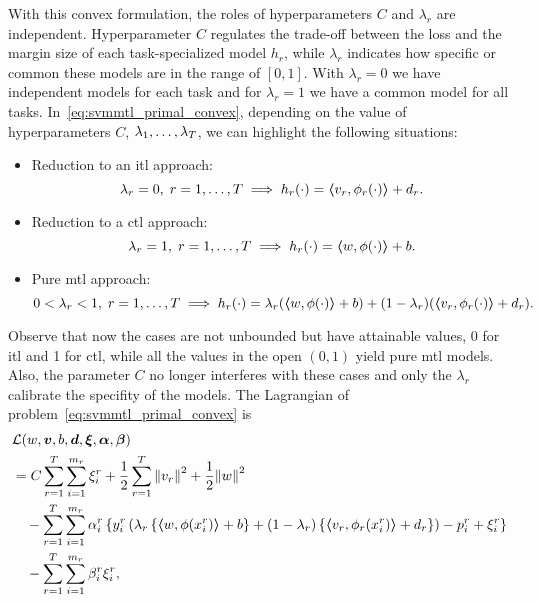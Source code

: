 With this convex formulation, the roles of hyperparameters $C$ and $\lambda_r$ are independent. Hyperparameter $C$ regulates the trade-off between the loss and the margin size of each task-specialized model $h_r$, while $\lambda_r$ indicates how specific or common these models are in the range of $[0, 1]$. With $\lambda_r=0$ we have independent models for each task and for $\lambda_r=1$ we have a common model for all tasks. 
%
In~\eqref{eq:svmmtl_primal_convex}, depending on the value of hyperparameters $C$, $\lambda_1, \ldots, \lambda_T$, we can highlight the following situations:
%
\begin{itemize}
    \item Reduction to an \acrshort{itl} approach:
    $$\lambda_r = 0 ,\; r=1, \ldots, T \implies h_r(\cdot) = \bm{\left\langle} {v}_r, \phi_r(\cdot) \bm{\right\rangle} + d_r .$$
    \item Reduction to a \acrshort{ctl} approach: 
    $$ \lambda_r = 1 ,\; r=1, \ldots, T \implies h_r(\cdot) = \bm{\left\langle} w, \phi(\cdot) \bm{\right\rangle} + b .$$
    \item Pure \acrshort{mtl} approach:
    $$ 0 < \lambda_r < 1 ,\; r=1, \ldots, T \implies h_r(\cdot) = \lambda_r (\bm{\left\langle} w, \phi(\cdot) \bm{\right\rangle} + b ) + (1 - \lambda_r) (\bm{\left\langle} {v}_r, \phi_r(\cdot) \bm{\right\rangle} + d_r) .$$
\end{itemize}
Observe that now the cases are not unbounded but have attainable values, 0 for \acrshort{itl} and 1 for \acrshort{ctl}, while all the values in the open $(0, 1)$ yield pure \acrshort{mtl} models. Also, the parameter $C$ no longer interferes with these cases and only the $\lambda_r$ calibrate the specifity of the models.
 The Lagrangian of problem~\eqref{eq:svmmtl_primal_convex} is
\begin{equation}
    \nonumber
    \begin{aligned}
        & \mathcal{L}({w}, \bm{v}, b, \bm{d}, \bm{\xi}, \bm{\alpha}, \bm{\beta}) \\
        &=  C \sum_{r= 1}^T \sum_{i=1}^{m_r} {\xi_{i}^r} + \frac{1}{2} \sum_{r= 1}^T{\left\lVert{v}_r\right\rVert^2} + \frac{1}{2} {\left\lVert{w}\right\rVert}^2 \\
        &\quad -  \sum_{r= 1}^T \sum_{i=1}^{m_r} \alpha_i^r \left\lbrace y_{i}^r  \left(\lambda_r \left\lbrace \bm{\left\langle} w, \phi(x_{i}^r) \bm{\right\rangle} + b  \right\rbrace + (1 - \lambda_r) \left\lbrace \bm{\left\langle} {v}_r, \phi_r(x_{i}^r) \bm{\right\rangle} + d_r \right\rbrace  \right) - p_{i}^r + \xi_{i}^r  \right\rbrace \\
        &\quad -  \sum_{r= 1}^T \sum_{i=1}^{m_r} \beta_i^r \xi_i^r ,
    \end{aligned}
\end{equation}
